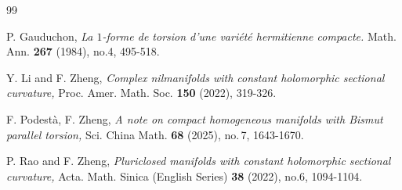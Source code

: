 \documentclass{amsart}
\begin{document}
\begin{thebibliography}{99}

 P. Gauduchon, \emph{La $1$-forme de torsion d'une vari\'et\'e hermitienne compacte.} Math. Ann. {\bf 267} (1984), no.4, 495-518.








 Y. Li and F. Zheng, \emph{Complex nilmanifolds with constant holomorphic sectional curvature,}  Proc. Amer. Math. Soc. {\bf 150} (2022), 319-326.

 F. Podest\`a, F. Zheng, \emph{A note on compact homogeneous manifolds with Bismut parallel torsion,} Sci. China Math. {\bf 68} (2025), no.\,7, 1643-1670.


 P. Rao and F. Zheng, \emph{ Pluriclosed manifolds with constant holomorphic sectional curvature,} Acta. Math. Sinica (English Series) {\bf 38} (2022), no.6, 1094-1104.







\end{thebibliography}
\end{document}
